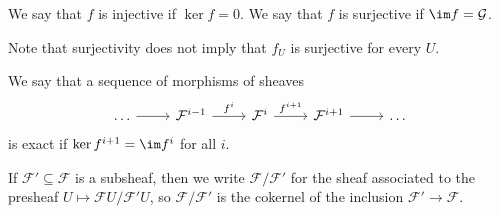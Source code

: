 We say that $f$ is injective if $\ker f = 0$. We say that $f$ is surjective if $\im f = \mathcal{G}$.

Note that surjectivity does not imply that $f_U$ is surjective for every $U$.

We say that a sequence of morphisms of sheaves
\[\begin{tikzcd}
	\ldots \arrow[r] & \mathcal{F}^{i-1} \arrow[r, "f^i"] & \mathcal{F}^i \arrow[r, "f^{i+1}"] & \mathcal{F}^{i+1} \arrow[r] & \ldots
\end{tikzcd}\]
is exact if $\ker f^{i+1} = \im f^i$ for all $i$.

If $\mathcal{F}' \subseteq \mathcal{F}$ is a subsheaf, then we write $\mathcal{F}/\mathcal{F}'$ for the
sheaf associated to the presheaf $U\mapsto \mathcal{F}U/\mathcal{F}'U$, so $\mathcal{F}/\mathcal{F}'$ is
the cokernel of the inclusion $\mathcal{F}' \to \mathcal{F}$.

